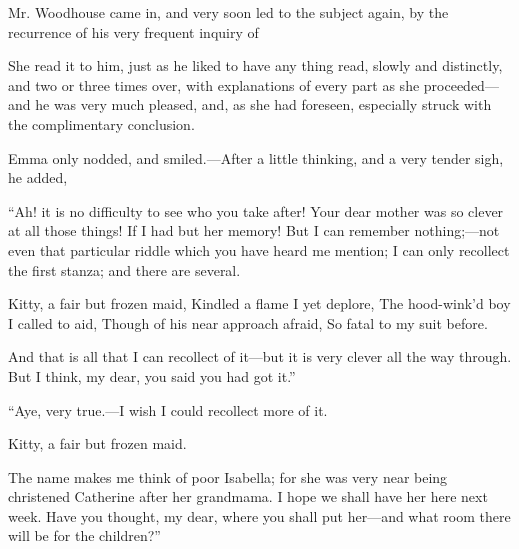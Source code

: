 
Mr. Woodhouse came in, and very soon led to the subject again, by the recurrence of his very frequent inquiry of 


She read it to him, just as he liked to have any thing read, slowly and distinctly, and two or three times over, with explanations of every part as she proceeded---and he was very much pleased, and, as she had foreseen, especially struck with the complimentary conclusion.


Emma only nodded, and smiled.---After a little thinking, and a very tender sigh, he added,

“Ah! it is no difficulty to see who you take after! Your dear mother was so clever at all those things! If I had but her memory! But I can remember nothing;---not even that particular riddle which you have heard me mention; I can only recollect the first stanza; and there are several.

Kitty, a fair but frozen maid,\crlf
Kindled a flame I yet deplore,\crlf
The hood-wink'd boy I called to aid,\crlf
Though of his near approach afraid,\crlf
So fatal to my suit before.

And that is all that I can recollect of it---but it is very clever all the way through. But I think, my dear, you said you had got it.”


“Aye, very true.---I wish I could recollect more of it.

Kitty, a fair but frozen maid.

The name makes me think of poor Isabella; for she was very near being christened Catherine after her grandmama. I hope we shall have her here next week. Have you thought, my dear, where you shall put her---and what room there will be for the children?”

